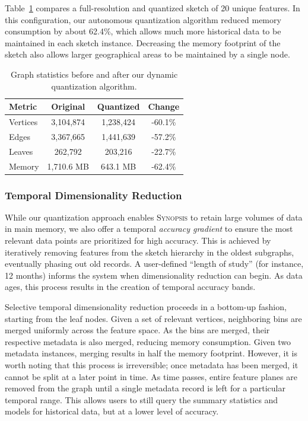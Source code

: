 Table~\ref{tbl:graph-stats} compares a full-resolution and quantized sketch of 20 unique features. In this configuration, our autonomous quantization algorithm reduced memory consumption by about 62.4\%, which allows much more historical data to be maintained in each sketch instance. Decreasing the memory footprint of the sketch also allows larger geographical areas to be maintained by a single node.

\begin{table}[h!]
    \renewcommand{\arraystretch}{1.3}
    \caption{Graph statistics before and after our dynamic quantization algorithm.}
    \label{tbl:graph-stats}
    \begin{center}
        \begin{tabular}{|l|c|c|c|}
            \hline
            \textbf{Metric} & \textbf{Original} & \textbf{Quantized} & \textbf{Change} \\
            \hline
            Vertices & 3,104,874 & 1,238,424 & -60.1\% \\
            \hline
            Edges    & 3,367,665 & 1,441,639 & -57.2\% \\
            \hline
            Leaves   & 262,792   & 203,216   & -22.7\% \\
            \hline
            Memory   & 1,710.6 MB & 643.1 MB  & -62.4\% \\
            \hline
        \end{tabular}
    \end{center}
\end{table}

\subsubsection{Temporal Dimensionality Reduction}
While our quantization approach enables \textsc{Synopsis} to retain large volumes of data in main memory, we also offer a temporal \emph{accuracy gradient} to ensure the most relevant data points are prioritized for high accuracy. This is achieved by iteratively removing features from the sketch hierarchy in the oldest subgraphs, eventually phasing out old records. A user-defined ``length of study'' (for instance, 12 months) informs the system when dimensionality reduction can begin. As data ages, this process results in the creation of temporal accuracy bands.

Selective temporal dimensionality reduction proceeds in a bottom-up fashion, starting from the leaf nodes. Given a set of relevant vertices, neighboring bins are merged uniformly across the feature space. As the bins are merged, their respective metadata is also merged, reducing memory consumption. Given two metadata instances, merging results in half the memory footprint. However, it is worth noting that this process is irreversible; once metadata has been merged, it cannot be split at a later point in time. As time passes, entire feature planes are removed from the graph until a single metadata record is left for a particular temporal range. This allows users to still query the summary statistics and models for historical data, but at a lower level of accuracy.

